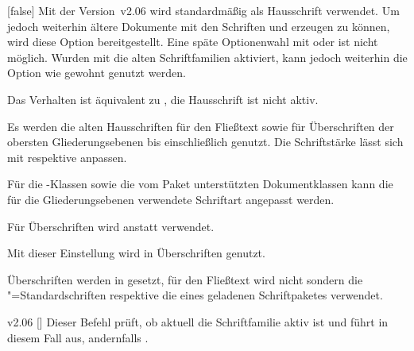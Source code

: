 %
\begin{Declaration}[v2.06]{}[false]
\printdeclarationlist%
%
Mit der Version~v2.06 wird standardmäßig \OpenSans als Hausschrift verwendet. 
Um jedoch weiterhin ältere Dokumente mit den Schriften \Univers und \DIN 
erzeugen zu können, wird diese Option bereitgestellt.
Eine späte Optionenwahl mit  oder  ist 
nicht möglich. Wurden mit  die alten Schriftfamilien 
aktiviert, kann jedoch weiterhin die Option  wie gewohnt 
genutzt werden.
%
\begin{values}{}
\item[false]
  Das Verhalten ist äquivalent zu , die Hausschrift ist 
  nicht aktiv.
\item[true]
  Es werden die alten Hausschriften \Univers für den Fließtext sowie \DIN für 
  Überschriften der obersten Gliederungsebenen bis einschließlich 
   genutzt. Die Schriftstärke lässt sich mit 
   respektive  anpassen.
\end{values}
%
Für die \TUDScript-Klassen sowie die vom Paket  
unterstützten Dokumentklassen kann die für die Gliederungsebenen verwendete 
Schriftart angepasst werden.
%
\begin{values}{}
\item[nodin]
  Für Überschriften wird \Univers anstatt \DIN verwendet.
\item[din]
  Mit dieser Einstellung wird \DIN in Überschriften genutzt. 
\item[onlydin]
  Überschriften werden in \DIN gesetzt, für den Fließtext wird nicht \Univers 
  sondern die "=Standardschriften respektive die eines geladenen 
  Schriftpaketes verwendet.
\end{values}
\end{Declaration}

\begin{Obsolete}{v2.06}{%
  []
}%
\printobsoletelist%
%
Dieser Befehl prüft, ob aktuell die Schriftfamilie \DIN aktiv ist und führt in 
diesem Fall  aus, andernfalls . 
\end{Obsolete}


